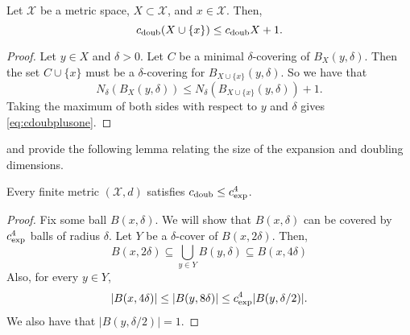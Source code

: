 \documentclass[thesis.tex]{subfiles}
\newcommand{\set}[1]{\mathcal {#1}}
\newcommand{\krdim}{\text{dim}_\textnormal{exp}}
\newcommand{\doubdim}{\text{dim}_\textnormal{doub}}
\newcommand{\cexp}{c_\textnormal{exp}}
\newcommand{\cdoub}{c_\textnormal{doub}}
\begin{document}
\begin{lemma}
    Let $\set X$ be a metric space, $X\subset\set X$, and $x\in\set X$.
    Then,
    \begin{equation}
        \label{eq:cdoubplusone}
        \cdoub (X\cup\{x\}) \le \cdoub X + 1.
    \end{equation}
\end{lemma}
\begin{proof}
    Let $y\in X$ and $\delta>0$.
    Let $C$ be a minimal $\delta$-covering of $B_X(y,\delta)$.
    Then the set $C\cup\{x\}$ must be a $\delta$-covering for $B_{X\cup\{x\}}(y,\delta)$.
    So we have that 
    \begin{equation}
        N_\delta(B_X(y,\delta)) \le N_\delta(B_{X\cup\{x\}}(y,\delta))+1
        .
    \end{equation}
    Taking the maximum of both sides with respect to $y$ and $\delta$ gives \eqref{eq:cdoubplusone}.
\end{proof}


\noindent
\citet{gupta2003bounded} and \cite{krauthgamer2004navigating} provide the following lemma relating the size of the expansion and doubling dimensions.

\begin{lemma}
    Every finite metric $(\set X,d)$ satisfies
    $\cdoub \le \cexp^4$.
\end{lemma}
\begin{proof}
    Fix some ball $B(x,\delta)$.
    We will show that $B(x,\delta)$ can be covered by $\cexp^4$ balls of radius $\delta$.
    Let $Y$ be a $\delta$-cover of $B(x,2\delta)$.
    Then,
    \begin{equation}
        B(x,2\delta) 
        \subseteq 
        \bigcup\limits_{y\in Y} B(y,\delta) 
        \subseteq
        B(x,4\delta)
    \end{equation}
    Also, for every $y\in Y$,
    \begin{equation}
        |B(x,4\delta)| 
        \le 
        |B(y,8\delta)| 
        \le 
        \cexp^4 |B(y,\delta/2)|
        .
    \end{equation}
    We also have that $|B(y,\delta/2)|=1$.
\end{proof}
\end{document}
